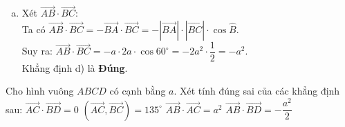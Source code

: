 \begin{ex}
{\begin{enumerate}[a)]
		\item Xét $\overrightarrow{AB} \cdot \overrightarrow{BC}$:\\
		Ta có $\overrightarrow{AB} \cdot \overrightarrow{BC} = -\overrightarrow{BA} \cdot \overrightarrow{BC} = - \left|\overrightarrow{BA}\right| \cdot \left|\overrightarrow{BC}\right| \cdot \cos\widehat{B}$.\\
		Suy ra: $\overrightarrow{AB} \cdot \overrightarrow{BC} = - a \cdot 2a \cdot \cos 60^\circ = -2a^2 \cdot \dfrac{1}{2} = -a^2$.\\
		Khẳng định d) là \textbf{Đúng}.
	\end{enumerate}
}
\end{ex}

\begin{ex}%
	Cho hình vuông $ABCD$ có cạnh bằng $a$. Xét tính đúng sai của các khẳng định sau:
	\choiceTF
	{\True  $\overrightarrow{AC}\cdot \overrightarrow{BD}=0$}
	{$\left( \overrightarrow{AC},\overrightarrow{BC} \right)=135^{\circ}$}
	{\True  $\overrightarrow{AB}\cdot \overrightarrow{AC}=a^2$}
	{$\overrightarrow{AB}\cdot \overrightarrow{BD}=-\dfrac{a^2}{2}$}
\end{ex}

